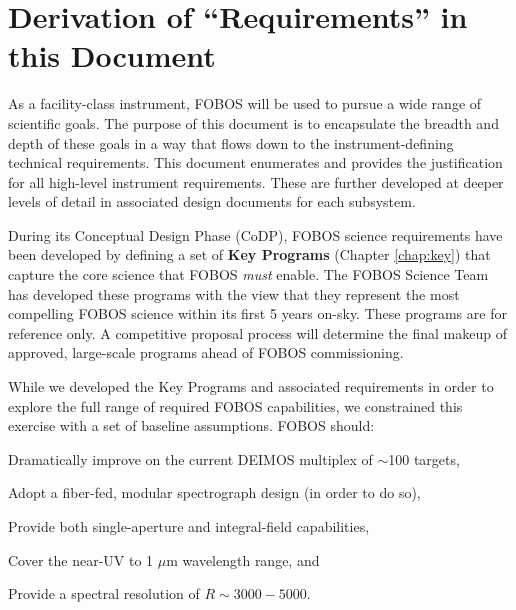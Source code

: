 \documentclass[11pt,a4paper,twoside,onecolumn,openany,final,oldfontcommands]{memoir}
\begin{document}
\section{Derivation of ``Requirements'' in this Document}

As a facility-class instrument, FOBOS will be used to pursue a wide range of scientific goals.  The purpose of this document is to encapsulate the breadth and depth of these goals in a way that flows down to the instrument-defining technical requirements.  This document enumerates and provides the justification for all high-level instrument requirements.  These are further developed at deeper levels of detail in associated design documents for each subsystem.

During its Conceptual Design Phase (CoDP), FOBOS science requirements have been developed by defining a set of \textbf{Key Programs} (Chapter \ref{chap:key}) that capture the core science that FOBOS \textit{must} enable.  The FOBOS Science Team has developed these programs with the view that they represent the most compelling FOBOS science within its first 5 years on-sky.  These programs are for reference only.  A competitive proposal process will determine the final makeup of approved, large-scale programs ahead of FOBOS commissioning. 


While we developed the Key Programs and associated requirements in order to explore the full range of required FOBOS capabilities, we constrained this exercise with a set of baseline assumptions.  FOBOS should:

\begin{asparaenum}
\item Dramatically improve on the current DEIMOS multiplex of $\sim$100 targets,
\item Adopt a fiber-fed, modular spectrograph design (in order to do so),
\item Provide both single-aperture and integral-field capabilities,
\item Cover the near-UV to 1 $\mu$m wavelength range, and
\item Provide a spectral resolution of $R\sim 3000-5000$.
\end{asparaenum}
\medskip
\end{document}
